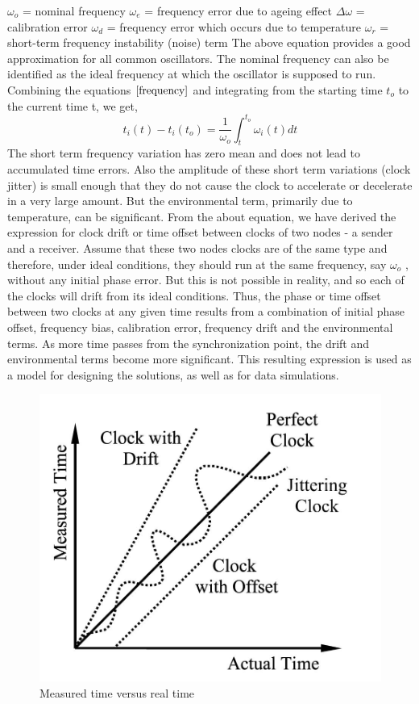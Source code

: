 \documentclass[a4paper,8pt]{report}
\begin{document}
      $\omega_o$ = nominal frequency \newline
      $\omega_e$ = frequency error due to ageing effect \newline
      $\Delta \omega$ = calibration error \newline
      $\omega_d$ = frequency error which occurs due to temperature \newline
      $\omega_r$ = short-term frequency instability (noise) term \newline
The above equation provides a good approximation for all common
oscillators. The nominal frequency can also be identified as the
ideal frequency at which the oscillator is supposed to run.
Combining the equations $\ref{frequency}$ and integrating from the
starting time $t_o$ to the current time t, we get,
\begin{equation}
t_i(t) - t_i(t_o) = \frac{1}{\omega_o} \int^{t_o}_{t}\omega_i(t)dt
\end{equation}
The short term frequency variation has zero mean and does not lead
to accumulated time errors. Also the amplitude of these short term
variations (clock jitter) is small enough that they do not cause the
clock to accelerate or decelerate in a very large amount. But the
environmental term, primarily due to temperature, can be
significant. From the about equation, we have derived the expression
for clock drift or time offset between clocks of two nodes - a
sender and a receiver. Assume that these two nodes clocks are of the
same type and therefore, under ideal conditions, they should run at
the same frequency, say $\omega_o$ , without any initial phase
error. But this is not possible in reality, and so each of the
clocks will drift from its ideal conditions.
     Thus, the phase or time offset between two clocks at any given time results from a
combination of initial phase offset, frequency bias, calibration error, frequency drift
and the environmental terms. As more time passes from the
synchronization point, the drift and environmental terms become more
significant.
       This resulting expression is used as a model for designing the solutions, as well as
for data simulations.
\begin{figure}[b]
\centering \includegraphics[width=0.5
\textwidth]{actualvsmeasuredtime} \caption{Measured time versus real
time} \label{fig:clocktimevsrealtime}
\end{figure}
\end{document}
